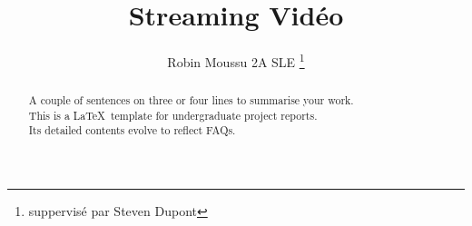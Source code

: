\documentclass[a4paper,11pt]{custom}
\newcommand{\smu}{\textsc{Smart Me Up}}
\begin{document}



\title{
  Streaming Vidéo
}
\author{
  Robin Moussu
  2A SLE
  \thanks{
    suppervisé par Steven Dupont
  }
}
\maketitle
\begin{abstract}\centering
A couple of sentences on three or four lines to summarise your work.\\ 
This is a \LaTeX\ template for undergraduate project reports.\\
Its detailed contents evolve to reflect FAQs.
\end{abstract}
%
%
%
%
%
%
%
%
%
\end{document}
